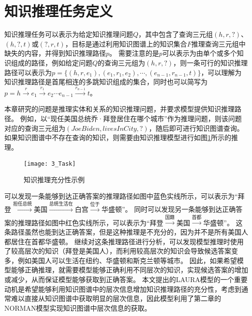 \documentclass[algorithmlist, AutoFakeBold, AutoFakeSlant, figurelist, tablelist, nomlist, engineering]{seuthesix}
\begin{document}
\section{知识推理任务定义}
知识推理任务可以表示为给定知识推理问题$Q$，其中包含了查询三元组$(h, r, ?)$、$(h, ?, t)$或$(?, r, t)$，目标是通过利用知识图谱上的知识集合$F$推理查询三元组中缺失的内容，并得到知识推理路径$p$。
需要注意的是$p$可以表示为由单个或多个知识组成的路径，例如给定问题$Q$的查询三元组为$(h, r, ?)$，则一条可行的知识推理路径可以表示为$p=\{(h, r, e_1), (e_1, r_1, e_2), \cdots, (e_{n-1}, r_{n-1}, t)\}$，可以理解为知识推理路径是首尾相连的多跳知识组成的集合，同时也可以简写为$p=h\xrightarrow{r}e_1\xrightarrow{r_1}e_2 \cdots e_{n-1}\xrightarrow{r_{n-1}}t$。

本章研究的问题是推理实体和关系的知识推理问题，并要求模型提供知识推理路径。
例如，以“现任美国总统乔·拜登居住在哪个城市”作为推理问题，则该问题对应的查询三元组为$(Joe Biden, livesInCity, ?)$，随后即可进行知识图谱查询。
如果知识图谱中不存在查询的知识，则需要由知识推理模型进行如图\ref{3_Task}所示的推理。
\begin{figure}[ht]
  \centering
  \texttt{[image: 3\_Task]}
  \caption{知识推理充分性示例}
  \label{3_Task}
\end{figure}

可以发现一条能够到达正确答案的推理路径如图中蓝色实线所示，可以表示为“拜登$\xrightarrow{\mbox{担任总统}}$美国$\xrightarrow{\mbox{总统生活在}}$白宫$\xrightarrow{\mbox{位于}}$华盛顿”。
同时可以发现另一条能够到达正确答案的推理路径如图中红色实线所示，可以表示为“拜登$\xrightarrow{\mbox{国籍}}$美国$\xrightarrow{\mbox{首都}}$华盛顿”。
这条路径虽然也能到达正确答案，但是这种推理是不充分的，因为并不是所有美国人都居住在首都华盛顿。
继续对这条推理路径进行分析，可以发现模型推理时使用了较高层次的知识（拜登是美国人），而利用较高层次的知识会导致候选答案变多，例如美国人可以生活在纽约、华盛顿和斯克兰顿等城市。
因此，如果希望模型能够正确推理，就需要模型能够正确利用不同层次的知识，实现候选答案的增加或减少，从而保证模型能够获取到正确答案。
本文提出的LAURA模型的一个重要动机是希望能够利用知识图谱中的层次信息增加知识推理路径的充分性，考虑到通常难以直接从知识图谱中获取明显的层次信息，因此模型利用了第二章的NORMAN模型实现知识图谱中层次信息的获取。
\end{document}
